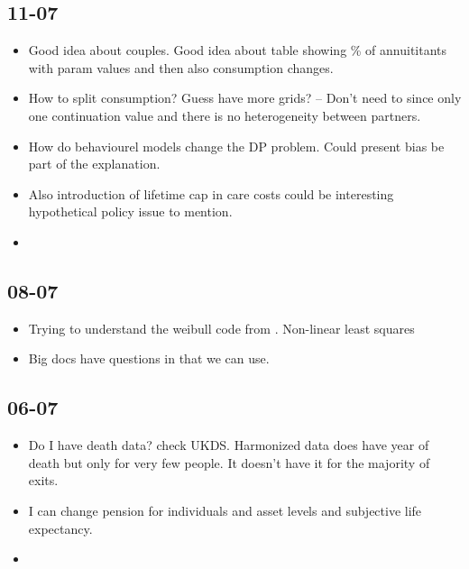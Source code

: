\documentclass[12pt]{article}
\begin{document}
\subsection{\textbf{11-07}}
\begin{itemize}
    \item Good idea about couples. Good idea about table showing \% of annuititants
          with param values and then also consumption changes.

    \item How to split consumption? Guess have more grids? -- Don't need to since only one
          continuation value and there is no heterogeneity between partners.
    \item How do behaviourel models change the DP problem. Could present bias
          be part of the explanation.

    \item Also introduction of lifetime cap in care costs could be interesting
          hypothetical policy issue to mention.

    \item
\end{itemize}


\subsection{\textbf{08-07}}
\begin{itemize}
    \item Trying to understand the weibull code from \cite{odea_sturrock_rest_2023}. Non-linear
          least squares
    \item Big docs have questions in that we can use.
\end{itemize}

\subsection{\textbf{06-07}}
\begin{itemize}
    \item Do I have death data? check UKDS.
          Harmonized data does have year of death but only for very few
          people. It doesn't have it for the majority of exits.

    \item I can change pension for individuals and asset levels and subjective life expectancy.
    \item

\end{itemize}
\end{document}
